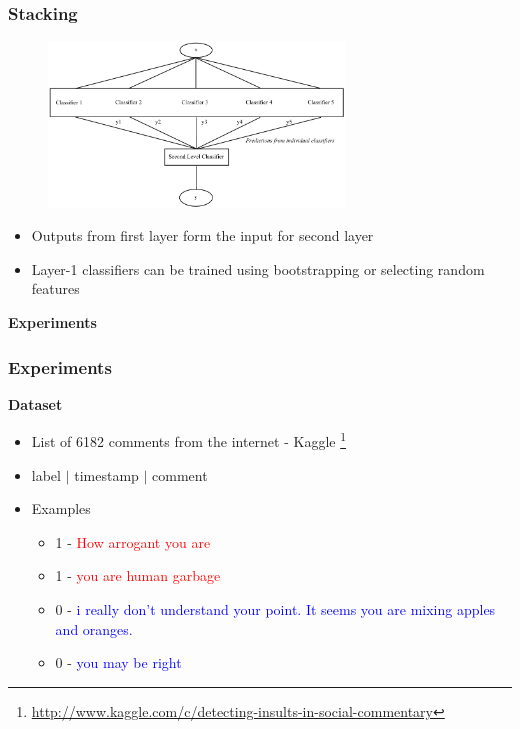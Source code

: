 \documentclass[xcolor=table]{beamer}
\begin{document}
    \begin{frame}
        \frametitle{Stacking}
        \begin{figure}
            \centering
            \includegraphics[width=0.7\textwidth]{figures/stacking_prediction_flow.png}
        \end{figure}
        \begin{itemize}
            \item{Outputs from first layer form the input for second layer}
            \item{Layer-1 classifiers can be trained using bootstrapping or selecting random features}
        \end{itemize}
    \end{frame}
    
    \begin{frame}
        \begin{center}
            \textbf{Experiments}
        \end{center}
    \end{frame}
    
    \begin{frame}
        \frametitle{Experiments}
        \begin{center}
            \textbf{Dataset}
        \end{center}
        \begin{itemize}
            \item{List of 6182 comments from the internet - Kaggle \footnote{\url{http://www.kaggle.com/c/detecting-insults-in-social-commentary}}}
            \item{label $|$ timestamp $|$ comment}
            \item{
            Examples
            \begin{itemize}
                \item{1 - \textcolor{red}{How arrogant you are}}
                \item{1 - \textcolor{red}{you are human garbage}}
                \item{0 - \textcolor{blue}{i really don't understand your point. It seems you are mixing apples and oranges.}}
                \item{0 - \textcolor{blue}{you may be right}}
            \end{itemize}
            }
        \end{itemize}
    \end{frame}
    
\end{document}
